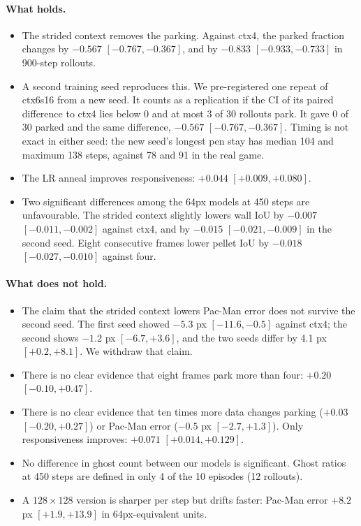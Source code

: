 \documentclass[11pt]{article}
\begin{document}
\paragraph{What holds.}
\begin{itemize}
\item The strided context removes the parking. Against ctx4, the parked fraction changes by $-0.567$
$[-0.767,-0.367]$, and by $-0.833$ $[-0.933,-0.733]$ in 900-step rollouts.
\item A second training seed reproduces this. We pre-registered one repeat of ctx6s16 from a new seed. It counts as
a replication if the CI of its paired difference to ctx4 lies below 0 and at most 3 of 30 rollouts park. It gave 0 of
30 parked and the same difference, $-0.567$ $[-0.767,-0.367]$. Timing is not exact in either seed: the new seed's
longest pen stay has median 104 and maximum 138 steps, against 78 and 91 in the real game.
\item The LR anneal improves responsiveness: $+0.044$ $[+0.009,+0.080]$.
\item Two significant differences among the 64px models at 450 steps are unfavourable. The strided context slightly
lowers wall IoU by $-0.007$ $[-0.011,-0.002]$ against ctx4, and by $-0.015$ $[-0.021,-0.009]$ in the second seed. Eight
consecutive frames lower pellet IoU by $-0.018$ $[-0.027,-0.010]$ against four.
\end{itemize}

\paragraph{What does not hold.}
\begin{itemize}
\item The claim that the strided context lowers Pac-Man error does not survive the second seed. The first seed
showed $-5.3$ px $[-11.6,-0.5]$ against ctx4; the second shows $-1.2$ px $[-6.7,+3.6]$, and the two seeds differ by
4.1 px $[+0.2,+8.1]$. We withdraw that claim.
\item There is no clear evidence that eight frames park more than four: $+0.20$ $[-0.10,+0.47]$.
\item There is no clear evidence that ten times more data changes parking ($+0.03$ $[-0.20,+0.27]$) or Pac-Man
error ($-0.5$ px $[-2.7,+1.3]$). Only responsiveness improves: $+0.071$ $[+0.014,+0.129]$.
\item No difference in ghost count between our models is significant. Ghost ratios at 450 steps are defined in only
4 of the 10 episodes (12 rollouts).
\item A $128\times128$ version is sharper per step but drifts faster: Pac-Man error $+8.2$ px $[+1.9,+13.9]$ in
64px-equivalent units.
\end{itemize}
\end{document}
